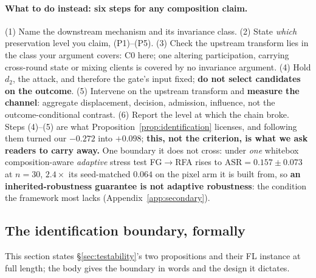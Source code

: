 \documentclass{article}
\begin{document}
\paragraph{What to do instead: six steps for any composition claim.} (1) Name the downstream mechanism and its invariance class. (2) State \emph{which} preservation level you claim, (P1)--(P5). (3) Check the upstream transform lies in the class your argument covers: C0 here; one altering participation, carrying cross-round state or mixing clients is covered by no invariance argument. (4) Hold $d_2$, the attack, and therefore the gate's input fixed; \textbf{do not select candidates on the outcome}. (5) Intervene on the upstream transform and \textbf{measure the channel}: aggregate displacement, decision, admission, influence, not the outcome-conditional contrast. (6) Report the level at which the chain broke. Steps (4)--(5) are what Proposition~\ref{prop:identification} licenses, and following them turned our $-0.272$ into $+0.098$; \textbf{this, not the criterion, is what we ask readers to carry away.} One boundary it does not cross: under \emph{one} whitebox composition-aware \emph{adaptive} stress test FG$\to$RFA rises to $\mathrm{ASR} = 0.157 \pm 0.073$ at $n{=}30$, $2.4\times$ its seed-matched $0.064$ on the pixel arm it is built from, so \textbf{an inherited-robustness guarantee is not adaptive robustness}: the condition the framework most lacks (Appendix~\ref{app:secondary}).

\subsection{The identification boundary, formally}
\label{app:boundary}

This section states \S\ref{sec:testability}'s two propositions and their FL instance at full length; the body gives the boundary in words and the design it dictates.
\end{document}
